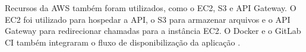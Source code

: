 Recursos da AWS também foram utilizados, como o EC2, S3 e API Gateway. O EC2 foi utilizado para hospedar a API, o S3 para armazenar arquivos e o API Gateway para redirecionar chamadas para a instância EC2. O Docker e o GitLab CI também integraram o fluxo de disponibilização da aplicação \cite{aws-docs,docker,gitlab-ci}.
